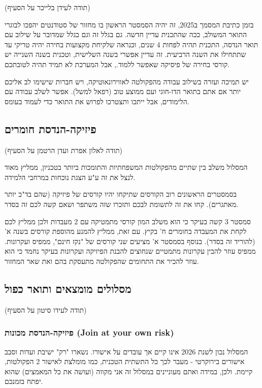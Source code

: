 \documentclass[a4paper,12pt]{article}
\begin{document}
(תודה לעידן בלייכר על הסעיף)

בזמן כתיבת המסמך ב2025, זה יהיה הסמסטר הראשון בו מחזור של סטודנטים יהפכו לבוגרי התואר המשולב, ככה שהתכנית עדיין חדשה. גם בגלל זה וגם בגלל שמדובר על שילוב עם תואר הנדסה, התכנית תהיה לפחות 4 שנים, וכנראה שלקיחת מקצועות בחירה יהיה טריקי עד שתתחילו את השנה הרביעית. זה עדיין אפשרי בשנה השלישית, וטכנית בשנה השנייה יש קורסי בחירה של פיסיקה שאפשר ללמוד., אבל המערכת לא תמיד תהיה לטובתכם.  

יש תמיכה ועזרה בשילוב עבודה מהפקולטה לאווירונאוטיקה, ויש חברות שישימו לב אליכם יותר אם אתם בתואר הדו-חוגי ועם ממוצע טוב (רפאל למשל). אפשר לשלב עבודה עם הלימודים, אבל ייתכו ותצטרכו לפרוש את התואר כדי לעמוד בעומס. 

\subsection{פיזיקה-הנדסת חומרים}

(תודה לאלון אפרת ועדן הרטמן על הסעיף)

המסלול משלב בין שתיים מהפקולטות המשפחתיות והתומכות ביותר בטכניון, ממליץ מאוד לנצל את זה ע"ע הצגת נוכחות במרחבי הלמידה.

בסמסטרים הראשונים רוב הקורסים שתיקחו יהיו קורסים של פיזיקה (שהם בד"כ יותר מאתגרים). קחו את זה לתשומת לבכם ותזכרו שזה משתפר ושאם קשה לכם זה בסדר.

סמסטר 3 קשה בעיקר כי הוא משלב המון קורסי מתמטיקה עם 2 מעבדות ולכן ממליץ לכם לקחת את המעבדה בחומרים ח' בקיץ. עם זאת, ממליץ להמנע מהוספת קורסים בשנה א' (להוריד זה בסדר). בנוסף בסמסטר א' מציעים שני קורסים של "נקז חינם", ממפיס ועקרונות. ממפיס עוזר להבין עקרונות מתמטיים שנחוצים להבנת הפיזיקה ועקרונות בעיקר נחמד כי הוא עוזר להכיר את התחומים שהפקולטה מתעסקת בהם ואת שאר המחזור.

\subsection{מסלולים מומצאים ותואר כפול}

(תודה לעידו סיטון על הסעיף)

\subsubsection{פיזיקה-הנדסת מכונות \textenglish{(Join at your own risk)}}

המסלול נכון לשנת 2026 אינו קיים אך עובדים על אישורו. נשארו "רק" ישיבת ועדות וסבב אישורים בירוקרטי - מעבר לכך כל התשתית הטכנית, כמו מומלצת לאישור 2 הפקולטות, קיימת. ולכן, במידה ואתם מעוניינים במסלול זה אני מקווה (ועושה את כל המאמצים) שהוא יפתח בזמנכם.
\end{document}
